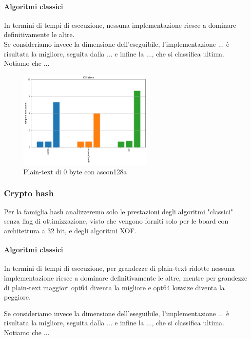\documentclass[12pt,a4paper,italian]{report}
\begin{document}
\paragraph{Algoritmi classici}

In termini di tempi di esecuzione, nessuna implementazione riesce a dominare definitivamente le altre. \\

\noindent Se consideriamo invece la dimensione dell'eseguibile, l'implementazione ...  è risultata la migliore, seguita dalla ... e infine la ..., che si classifica ultima. Notiamo che ...

\begin{figure}[H]
    \centering
    \includegraphics[width=0.6\textwidth]{raspberry/ascon128a.pdf}
    \caption{Plain-text di 0 byte con ascon128a}
\end{figure}

\subsubsection{Crypto hash}

Per la famiglia hash analizzeremo solo le prestazioni degli algoritmi "classici" senza flag di ottimizzazione, visto che vengono forniti solo per le board con architettura a 32 bit, e degli algoritmi XOF.

\paragraph{Algoritmi classici}

In termini di tempi di esecuzione, per grandezze di plain-text ridotte nessuna implementazione riesce a dominare definitivamente le altre, mentre per grandezze di plain-text maggiori opt64 diventa la migliore e opt64 lowsize diventa la peggiore.

\noindent Se consideriamo invece la dimensione dell'eseguibile, l'implementazione ...  è risultata la migliore, seguita dalla ... e infine la ..., che si classifica ultima. Notiamo che ...
\end{document}

